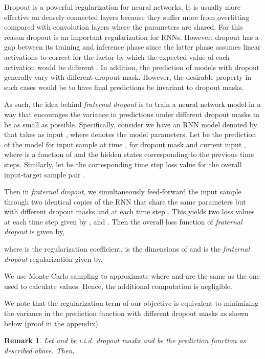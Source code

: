 \documentclass{article} \usepackage{iclr2018_conference,times}
\newtheorem{remark}{Remark}
\begin{document}
Dropout is a powerful regularization for neural networks. It is usually more effective on densely connected layers because they suffer more from overfitting compared with convolution layers where the parameters are shared. For this reason dropout is an important regularization for RNNs. However, dropout has a gap between its training and inference phase since the latter phase assumes linear activations to correct for the factor by which the expected value of each activation would be different \cite{ma2016dropout}. In addition, the prediction of models with dropout generally vary with different dropout mask. However, the desirable property in such cases would be to have final predictions be invariant to dropout masks.

As such, the idea behind \emph{fraternal dropout} is to train a neural network model in a way that encourages the variance in predictions under different dropout masks to be as small as possible. Specifically, consider we have an RNN model denoted by  that takes as input , where  denotes the model parameters. Let  be the prediction of the model for input sample  at time , for dropout mask  and current input , where  is a function of  and the hidden states corresponding to the previous time steps. Similarly, let  be the corresponding  time step loss value for the overall input-target sample pair .

Then in \emph{fraternal dropout}, we simultaneously feed-forward the input sample  through two identical copies of the RNN that share the same parameters  but with different dropout masks  and  at each time step . This yields two loss values at each time step  given by , and . Then the overall loss function of \emph{fraternal dropout} is given by,

where  is the regularization coefficient,  is the dimensions of  and  is the \emph{fraternal dropout} regularization given by,

We use Monte Carlo sampling to approximate  where  and  are the same as the one used to calculate  values. Hence, the additional computation is negligible.

We note that the regularization term of our objective is equivalent to minimizing the variance in the prediction function with different dropout masks as shown below (proof in the appendix).
\begin{remark}
\label{remark_var}
Let  and  be i.i.d. dropout masks and  be the prediction function as described above. Then, 

\end{remark}
\end{document}
